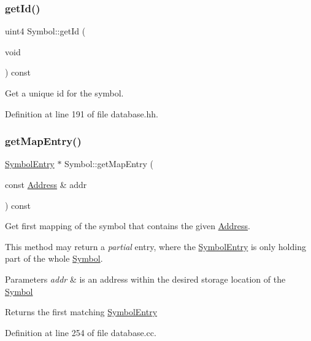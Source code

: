 \subsubsection{\texorpdfstring{getId()}{getId()}}
{\footnotesize\ttfamily uint4 Symbol\+::get\+Id (\begin{DoxyParamCaption}\item[{void}]{ }\end{DoxyParamCaption}) const\hspace{0.3cm}{\ttfamily [inline]}}



Get a unique id for the symbol. 



Definition at line 191 of file database.\+hh.

\mbox{\label{class_symbol_a0f86b85ac74fc36f1df80b48b658af1c}} 
\subsubsection{\texorpdfstring{getMapEntry()}{getMapEntry()}}
{\footnotesize\ttfamily \mbox{\hyperlink{class_symbol_entry}{Symbol\+Entry}} $\ast$ Symbol\+::get\+Map\+Entry (\begin{DoxyParamCaption}\item[{const \mbox{\hyperlink{class_address}{Address}} \&}]{addr }\end{DoxyParamCaption}) const}



Get first mapping of the symbol that contains the given \mbox{\hyperlink{class_address}{Address}}. 

This method may return a {\itshape partial} entry, where the \mbox{\hyperlink{class_symbol_entry}{Symbol\+Entry}} is only holding part of the whole \mbox{\hyperlink{class_symbol}{Symbol}}. 
\begin{DoxyParams}{Parameters}
{\em addr} & is an address within the desired storage location of the \mbox{\hyperlink{class_symbol}{Symbol}} \\
\hline
\end{DoxyParams}
\begin{DoxyReturn}{Returns}
the first matching \mbox{\hyperlink{class_symbol_entry}{Symbol\+Entry}} 
\end{DoxyReturn}


Definition at line 254 of file database.\+cc.

